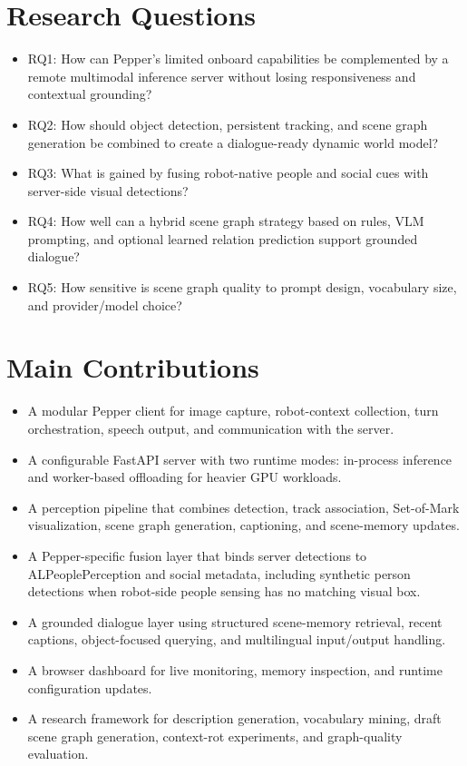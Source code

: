 \documentclass[
  digital,     %
  oneside,     %
  nosansbold,  %
  nocolorbold, %
  lof,         %
  lot,         %
]{fithesis4}
\begin{document}
\section{Research Questions}
\begin{itemize}
    \item RQ1: How can Pepper's limited onboard capabilities be complemented by a remote multimodal inference server without losing responsiveness and contextual grounding?
    \item RQ2: How should object detection, persistent tracking, and scene graph generation be combined to create a dialogue-ready dynamic world model?
    \item RQ3: What is gained by fusing robot-native people and social cues with server-side visual detections?
    \item RQ4: How well can a hybrid scene graph strategy based on rules, VLM prompting, and optional learned relation prediction support grounded dialogue?
    \item RQ5: How sensitive is scene graph quality to prompt design, vocabulary size, and provider/model choice?
\end{itemize}

\section{Main Contributions}
\begin{itemize}
    \item A modular Pepper client for image capture, robot-context collection, turn orchestration, speech output, and communication with the server.
    \item A configurable FastAPI server with two runtime modes: in-process inference and worker-based offloading for heavier GPU workloads.
    \item A perception pipeline that combines detection, track association, Set-of-Mark visualization, scene graph generation, captioning, and scene-memory updates.
    \item A Pepper-specific fusion layer that binds server detections to ALPeoplePerception and social metadata, including synthetic person detections when robot-side people sensing has no matching visual box.
    \item A grounded dialogue layer using structured scene-memory retrieval, recent captions, object-focused querying, and multilingual input/output handling.
    \item A browser dashboard for live monitoring, memory inspection, and runtime configuration updates.
    \item A research framework for description generation, vocabulary mining, draft scene graph generation, context-rot experiments, and graph-quality evaluation.
\end{itemize}
\end{document}
